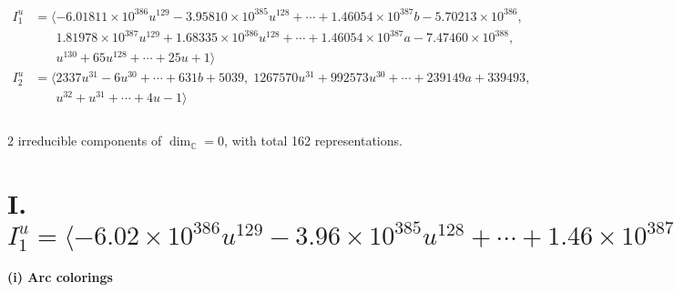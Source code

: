 \documentclass[1p]{elsarticle_modified}
\theoremstyle{definition}
\begin{document}
\begin{align*}
I^u_{1}&=\langle 
-6.01811\times10^{386} u^{129}-3.95810\times10^{385} u^{128}+\cdots+1.46054\times10^{387} b-5.70213\times10^{386},\\
\phantom{I^u_{1}}&\phantom{= \langle  }1.81978\times10^{387} u^{129}+1.68335\times10^{386} u^{128}+\cdots+1.46054\times10^{387} a-7.47460\times10^{388},\\
\phantom{I^u_{1}}&\phantom{= \langle  }u^{130}+65 u^{128}+\cdots+25 u+1\rangle \\
I^u_{2}&=\langle 
2337 u^{31}-6 u^{30}+\cdots+631 b+5039,\;1267570 u^{31}+992573 u^{30}+\cdots+239149 a+339493,\\
\phantom{I^u_{2}}&\phantom{= \langle  }u^{32}+u^{31}+\cdots+4 u-1\rangle \\
\\
\end{align*}
\raggedright * 2 irreducible components of $\dim_{\mathbb{C}}=0$, with total 162 representations.\\
\newpage
\renewcommand{\arraystretch}{1}
\centering \section*{I. $I^u_{1}= \langle -6.02\times10^{386} u^{129}-3.96\times10^{385} u^{128}+\cdots+1.46\times10^{387} b-5.70\times10^{386},\;1.82\times10^{387} u^{129}+1.68\times10^{386} u^{128}+\cdots+1.46\times10^{387} a-7.47\times10^{388},\;u^{130}+65 u^{128}+\cdots+25 u+1 \rangle$}
\flushleft \textbf{(i) Arc colorings}\\
\end{document}
